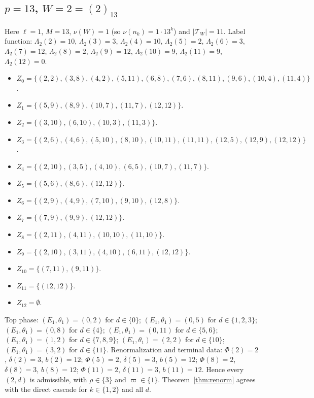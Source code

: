\subsection*{$p=13$, $W=2=(2)_{13}$}
Here $\ell=1$, $M=13$, $\nu(W)=1$ (so $\nu(n_k)=1\cdot13^k$) and $|\mathcal T_W|=11$.
Label function: $\Lambda_{2}(2)=10$, $\Lambda_{2}(3)=3$, $\Lambda_{2}(4)=10$, $\Lambda_{2}(5)=2$, $\Lambda_{2}(6)=3$, $\Lambda_{2}(7)=12$, $\Lambda_{2}(8)=2$, $\Lambda_{2}(9)=12$, $\Lambda_{2}(10)=9$, $\Lambda_{2}(11)=9$, $\Lambda_{2}(12)=0$.
\begin{itemize}[leftmargin=*]
\item $Z_{0}=\{(2,2), (3,8), (4,2), (5,11), (6,8), (7,6), (8,11), (9,6), (10,4), (11,4)\}$.
\item $Z_{1}=\{(5,9), (8,9), (10,7), (11,7), (12,12)\}$.
\item $Z_{2}=\{(3,10), (6,10), (10,3), (11,3)\}$.
\item $Z_{3}=\{(2,6), (4,6), (5,10), (8,10), (10,11), (11,11), (12,5), (12,9), (12,12)\}$.
\item $Z_{4}=\{(2,10), (3,5), (4,10), (6,5), (10,7), (11,7)\}$.
\item $Z_{5}=\{(5,6), (8,6), (12,12)\}$.
\item $Z_{6}=\{(2,9), (4,9), (7,10), (9,10), (12,8)\}$.
\item $Z_{7}=\{(7,9), (9,9), (12,12)\}$.
\item $Z_{8}=\{(2,11), (4,11), (10,10), (11,10)\}$.
\item $Z_{9}=\{(2,10), (3,11), (4,10), (6,11), (12,12)\}$.
\item $Z_{10}=\{(7,11), (9,11)\}$.
\item $Z_{11}=\{(12,12)\}$.
\item $Z_{12}=\emptyset$.
\end{itemize}
Top phase: $(E_1,\theta_1)=(0,2)$ for $d\in\{0\}$; $(E_1,\theta_1)=(0,5)$ for $d\in\{1,2,3\}$; $(E_1,\theta_1)=(0,8)$ for $d\in\{4\}$; $(E_1,\theta_1)=(0,11)$ for $d\in\{5,6\}$; $(E_1,\theta_1)=(1,2)$ for $d\in\{7,8,9\}$; $(E_1,\theta_1)=(2,2)$ for $d\in\{10\}$; $(E_1,\theta_1)=(3,2)$ for $d\in\{11\}$.
Renormalization and terminal data: $\Phi(2)=2$, $\delta(2)=3$, $b(2)=12$; $\Phi(5)=2$, $\delta(5)=3$, $b(5)=12$; $\Phi(8)=2$, $\delta(8)=3$, $b(8)=12$; $\Phi(11)=2$, $\delta(11)=3$, $b(11)=12$. Hence every $(2,d)$ is admissible, with $\rho\in\{3\}$ and $\varpi\in\{1\}$. Theorem~\ref{thm:renorm} agrees with the direct cascade for $k\in\{1,2\}$ and all $d$.

